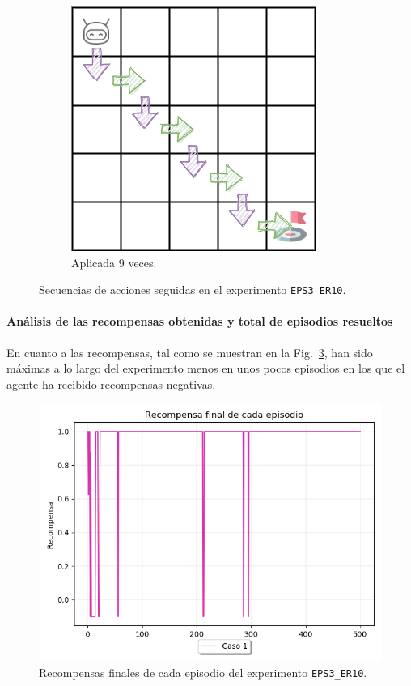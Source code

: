\begin{figure}
\begin{subfigure}{.3\textwidth}
        \includegraphics[scale=0.35]{cap5_experimentacion/images/dim5_lr0.01_ep0.9_9.png}
        \caption{Aplicada 9 veces.}
        \label{fig:dim5_lr0.01_ep0.9_9}
    \end{subfigure}
    \caption{Secuencias de acciones seguidas en el experimento \texttt{EPS3\_ER10}.}
    \label{fig:dim5_lr0.01_ep0.9}
\end{figure}

\paragraph{Análisis de las recompensas obtenidas y total de episodios resueltos} 
 
En cuanto a las recompensas, tal como se muestran en la Fig.~\ref{fig:dim5_lr0.01_ep0.9_recompensa}, han sido máximas a lo largo del experimento menos en unos pocos episodios en los que el agente ha recibido recompensas negativas. \\
 
\begin{figure}
    \centering
    \includegraphics[scale=0.4]{cap5_experimentacion/images/dim5_lr0.01_ep0.9_recompensa.png}
    \caption{Recompensas finales de cada episodio del experimento \texttt{EPS3\_ER10}.}
    \label{fig:dim5_lr0.01_ep0.9_recompensa}
\end{figure}

